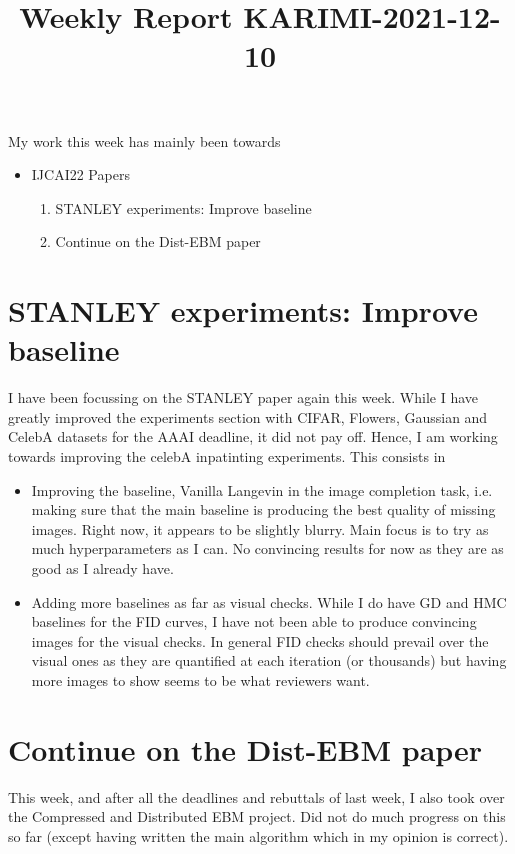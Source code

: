 \documentclass{article}
\begin{document}
\title{Weekly Report KARIMI-2021-12-10}


\date{}
\maketitle




My work this week has mainly been towards
\begin{itemize}
\item IJCAI22 Papers
\begin{enumerate}
	\item STANLEY experiments: Improve baseline
	\item Continue on the Dist-EBM paper
\end{enumerate}
\end{itemize}

\section{STANLEY experiments: Improve baseline}

I have been focussing on the STANLEY paper again this week.
While I have greatly improved the experiments section with CIFAR, Flowers, Gaussian and CelebA datasets for the AAAI deadline, it did not pay off.
Hence, I am working towards improving the celebA inpatinting experiments.
This consists in 

\begin{itemize}
\item Improving the baseline, Vanilla Langevin in the image completion task, i.e. making sure that the main baseline is producing the best quality of missing images. Right now, it appears to be slightly blurry. Main focus is to try as much hyperparameters as I can. No convincing results for now as they are as good as I already have.
\item Adding more baselines as far as visual checks. While I do have GD and HMC baselines for the FID curves, I have not been able to produce convincing images for the visual checks. 
In general FID checks should prevail over the visual ones as they are quantified at each iteration (or thousands) but having more images to show seems to be what reviewers want.
\end{itemize}



\section{Continue on the Dist-EBM paper}
This week, and after all the deadlines and rebuttals of last week, I also took over the Compressed and Distributed EBM project.
Did not do much progress on this so far (except having written the main algorithm which in my opinion is correct).
\end{document}
